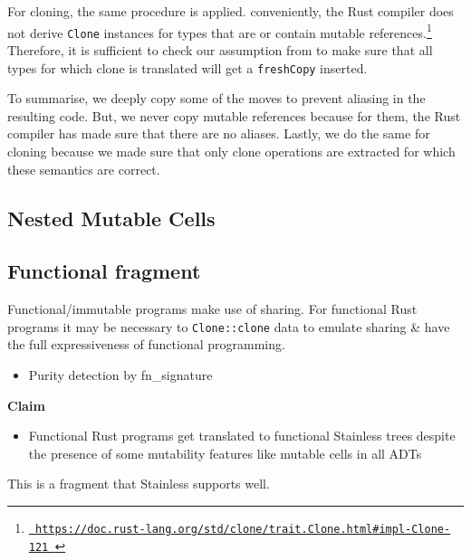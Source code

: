 For cloning, the same procedure is applied. conveniently, the Rust compiler does
not derive \lstinline!Clone! instances for types that are or contain mutable
references.\footnote{\href{}{\texttt{\color{MidnightBlue}
https://doc.rust-lang.org/std/clone/trait.Clone.html\#impl-Clone-121 }}}
Therefore, it is sufficient to check our assumption from
 to make sure that all types for which clone is
translated will get a \lstinline!freshCopy! inserted.

To summarise, we deeply copy some of the moves to prevent aliasing in the
resulting code. But, we never copy mutable references because for them, the Rust
compiler has made sure that there are no aliases. Lastly, we do the same for
cloning because we made sure that only clone operations are extracted for which
these semantics are correct.




\subsection{Nested Mutable Cells}




\subsection{Functional fragment}

Functional/immutable programs make use of sharing. For functional Rust
programs it may be necessary to \passthrough{\lstinline!Clone::clone!}
data to emulate sharing \& have the full expressiveness of functional
programming.

\begin{itemize}
\tightlist
\item
  Purity detection by fn\_signature
\end{itemize}

\textbf{Claim}

\begin{itemize}
\tightlist
\item
  Functional Rust programs get translated to functional Stainless trees
  despite the presence of some mutability features like mutable cells in
  all ADTs
\end{itemize}

This is a fragment that Stainless supports well.
